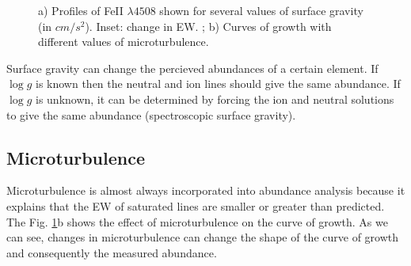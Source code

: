 \documentclass[dvips,12pt,a4paper]{report}
\begin{document}
{\begin{figure}[h]
\centering
\caption[Line Profiles of FeII with $log\,g$ ; Curves of growth dependent of microturbulence] {a) Profiles of FeII $\lambda4508$ shown for several values of surface gravity (in $cm/s^2$). Inset: change in EW. ; b) Curves of growth with different values of microturbulence.}
\label{cogpmt}
\end{figure}

Surface gravity can change the percieved abundances of a certain element. If $\log g$  is known then the neutral and ion lines should give the same abundance. If $\log g$ is unknown, it can be determined by forcing the ion and neutral solutions to give the same abundance (spectroscopic surface gravity).

\subsection{Microturbulence}
\label{microturbo}

Microturbulence is almost always incorporated into abundance analysis because it explains that the EW of saturated lines are smaller or greater than predicted. The Fig. \ref{cogpmt}b shows the effect of microturbulence on the curve of growth. As we can see, changes in microturbulence can change the shape of the curve of growth and consequently the measured abundance. 

}
\end{document}

